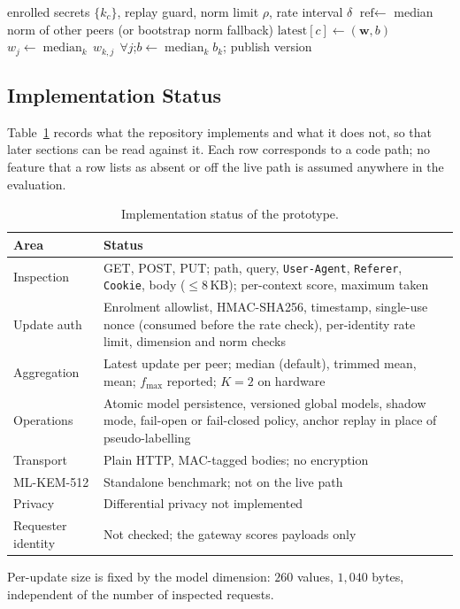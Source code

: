 \begin{algorithm}[t]
\caption{Cloud aggregator: handling an update}
\label{alg:aggregator}
\begin{algorithmic}[1]
\Require enrolled secrets $\{k_c\}$, replay guard, norm limit $\rho$, rate interval $\delta$
    \EndIf {}
    \EndIf
    \EndIf
  \State $\text{ref}\gets$ median norm of other peers (or bootstrap norm fallback)
    \EndIf
  \State $\text{latest}[c]\gets(\mathbf{w},b)$
  \State $w_j\gets\operatorname{median}_k\, w_{k,j}\ \ \forall j$;\quad $b\gets\operatorname{median}_k b_k$; publish version
  \State {}
\EndProcedure
\end{algorithmic}
\end{algorithm}

\subsection{Implementation Status}
\label{sec:sys-status}
Table~\ref{tab:sys-status} records what the repository implements and what it does not, so that later sections can be read against it. Each row corresponds to a code path; no feature that a row lists as absent or off the live path is assumed anywhere in the evaluation.

\begin{table}[t]
\centering
\caption{Implementation status of the prototype.}
\label{tab:sys-status}
\small
\begin{tabular}{@{}p{2.5cm}p{5.3cm}@{}}
\toprule
\textbf{Area} & \textbf{Status} \\ \midrule
Inspection & GET, POST, PUT; path, query, \texttt{User-Agent}, \texttt{Referer}, \texttt{Cookie}, body ($\le8$\,KB); per-context score, maximum taken \\
Update auth & Enrolment allowlist, HMAC-SHA256, timestamp, single-use nonce (consumed before the rate check), per-identity rate limit, dimension and norm checks \\
Aggregation & Latest update per peer; median (default), trimmed mean, mean; $f_{\max}$ reported; $K=2$ on hardware \\
Operations & Atomic model persistence, versioned global models, shadow mode, fail-open or fail-closed policy, anchor replay in place of pseudo-labelling \\
Transport & Plain HTTP, MAC-tagged bodies; no encryption \\
ML-KEM-512 & Standalone benchmark; not on the live path \\
Privacy & Differential privacy not implemented \\
Requester identity & Not checked; the gateway scores payloads only \\
\bottomrule
\end{tabular}
\end{table}

Per-update size is fixed by the model dimension: $260$ values, $1{,}040$ bytes, independent of the number of inspected requests.
